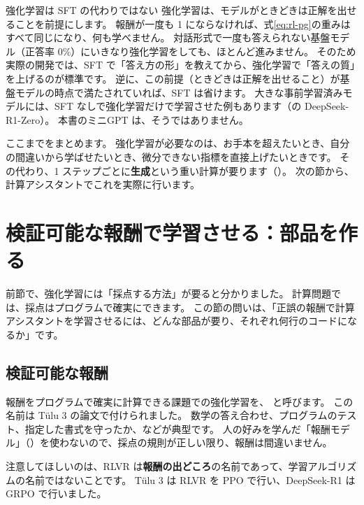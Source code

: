 \begin{caution}{強化学習は SFT の代わりではない}
強化学習は、モデルがときどきは正解を出せることを前提にします。
報酬が一度も 1 にならなければ、式\eqref{eq:rl-pg}の重みはすべて同じになり、何も学べません。
対話形式で一度も答えられない基盤モデル（正答率 0\%）にいきなり強化学習をしても、ほとんど進みません。
そのため実際の開発では、SFT で「答え方の形」を教えてから、強化学習で「答えの質」を上げるのが標準です\cite{ouyang2022training,guo2025deepseekr1}。
逆に、この前提（ときどきは正解を出せること）が基盤モデルの時点で満たされていれば、SFT は省けます。
大きな事前学習済みモデルには、SFT なしで強化学習だけで学習させた例もあります（の DeepSeek-R1-Zero）。
本書のミニGPT は、そうではありません。
\end{caution}

ここまでをまとめます。
強化学習が必要なのは、お手本を超えたいとき、自分の間違いから学ばせたいとき、微分できない指標を直接上げたいときです。
その代わり、1 ステップごとに\textbf{生成}という重い計算が要ります（）。
次の節から、計算アシスタントでこれを実際に行います。

\section{検証可能な報酬で学習させる：部品を作る}\label{sec:rl-rlvr}

前節で、強化学習には「採点する方法」が要ると分かりました。
計算問題では、採点はプログラムで確実にできます。
この節の問いは、「正誤の報酬で計算アシスタントを学習させるには、どんな部品が要り、それぞれ何行のコードになるか」です。

\subsection{検証可能な報酬}

報酬をプログラムで確実に計算できる課題での強化学習を、
と呼びます。
この名前は Tülu 3 の論文\cite{lambert2024tulu3}で付けられました。
数学の答え合わせ、プログラムのテスト、指定した書式を守ったか、などが典型です。
人の好みを学んだ「報酬モデル」（）を使わないので、採点の規則が正しい限り、報酬は間違いません。

注意してほしいのは、RLVR は\textbf{報酬の出どころ}の名前であって、学習アルゴリズムの名前ではないことです。
Tülu 3 は RLVR を PPO で行い、DeepSeek-R1 は GRPO で行いました\cite{lambert2024tulu3,guo2025deepseekr1}。

